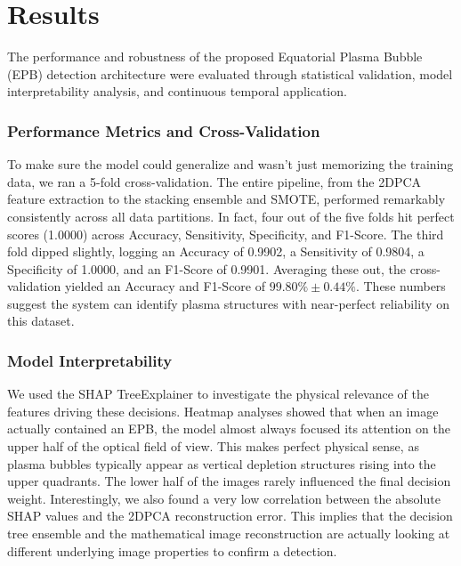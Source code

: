 \chapter{Results}\label{chap:results}

The performance and robustness of the proposed Equatorial Plasma Bubble (EPB) detection architecture were evaluated through statistical validation, model interpretability analysis, and continuous temporal application. 

\subsection{Performance Metrics and Cross-Validation}
To make sure the model could generalize and wasn't just memorizing the training data, we ran a 5-fold cross-validation. The entire pipeline, from the 2DPCA feature extraction to the stacking ensemble and SMOTE, performed remarkably consistently across all data partitions. In fact, four out of the five folds hit perfect scores (1.0000) across Accuracy, Sensitivity, Specificity, and F1-Score. The third fold dipped slightly, logging an Accuracy of 0.9902, a Sensitivity of 0.9804, a Specificity of 1.0000, and an F1-Score of 0.9901. Averaging these out, the cross-validation yielded an Accuracy and F1-Score of $99.80\% \pm 0.44\%$. These numbers suggest the system can identify plasma structures with near-perfect reliability on this dataset.

\subsection{Model Interpretability}
We used the SHAP TreeExplainer to investigate the physical relevance of the features driving these decisions. Heatmap analyses showed that when an image actually contained an EPB, the model almost always focused its attention on the upper half of the optical field of view. This makes perfect physical sense, as plasma bubbles typically appear as vertical depletion structures rising into the upper quadrants. The lower half of the images rarely influenced the final decision weight. Interestingly, we also found a very low correlation between the absolute SHAP values and the 2DPCA reconstruction error. This implies that the decision tree ensemble and the mathematical image reconstruction are actually looking at different underlying image properties to confirm a detection.


